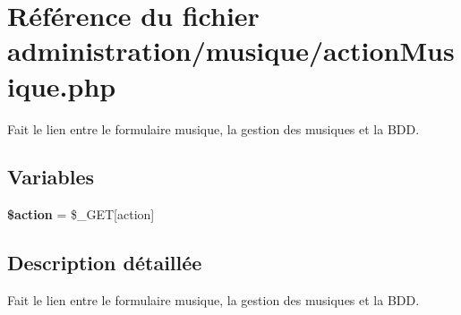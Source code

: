 \hypertarget{actionMusique_8php}{}\section{Référence du fichier administration/musique/action\+Musique.php}
\label{actionMusique_8php}


Fait le lien entre le formulaire musique, la gestion des musiques et la B\+DD.  


\subsection*{Variables}
\begin{DoxyCompactItemize}
\item 
\mbox{\label{actionMusique_8php_aa698a3e72116e8e778be0e95d908ee30}} 
{\bfseries \$action} = \$\+\_\+\+G\+ET\mbox{[}\textquotesingle{}action\textquotesingle{}\mbox{]}
\end{DoxyCompactItemize}


\subsection{Description détaillée}
Fait le lien entre le formulaire musique, la gestion des musiques et la B\+DD. 

